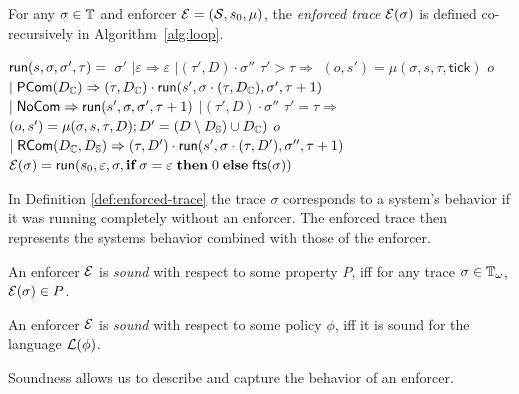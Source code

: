 \begin{definition}
    \label{def:enforced-trace}
    For any $\sigma \in \mathbb{T}$ and enforcer  $\mathcal{E}=(\mathcal{S},s_0,\mu)$, the
    \emph{enforced trace} $\mathcal{E}(\sigma)$ is defined co-recursively in
    Algorithm~\ref{alg:loop}.
    \begin{algorithm}[t]
        \begin{algorithmic}[1]
            \State $\mathsf{run}(s,\sigma,\sigma',\tau)=$~\Case\;$\sigma'$ \OOf
            \State $\mid \varepsilon \Rightarrow \varepsilon$
            \State $\mid(\tau', D) \cdot \sigma''$ \When\;$\tau' > \tau \Rightarrow$
            \Let\;$(o,s') = \mu(\sigma,s,\tau,\mathsf{tick})$ \IIn{}
            \State \quad \Case\;$o$ \OOf~$\mid\mathsf{PCom}(D_{\mathbb{C}}) \Rightarrow (\tau,D_{\mathbb{C}}) \cdot
                \mathsf{run}(s',\sigma\cdot (\tau, D_{\mathbb{C}}),\sigma',\tau+1)$
            \State \qquad\qquad\quad~$\mid\mathsf{NoCom} \Rightarrow \mathsf{run}(s',\sigma,\sigma',\tau+1)$
            \State  $\mid(\tau', D) \cdot \sigma''$ \When\;$\tau' = \tau \Rightarrow$
            \Let\;$(o,s') = \mu(\sigma,s,\tau,D); D' = (D \setminus D_{\mathbb{S}}) \cup D_{\mathbb{C}})$ \IIn
            \State \quad \Case\;$o$ \OOf ~$\mid \mathsf{RCom}(D_{\mathbb{C}},D_{\mathbb{S}})
                \Rightarrow (\tau, D') \cdot \mathsf{run}(s',\sigma \cdot (\tau, D'),\sigma'',\tau+1)$
            \State $\mathcal{E}(\sigma)=
                \mathsf{run}(s_0,\varepsilon,\sigma,\textbf{if}\;{\sigma=\varepsilon}\;\textbf{then}\;{0}\;\textbf{else}\;{\mathsf{fts}(\sigma)})$
        \end{algorithmic}
    \caption{Enforced trace\label{alg:loop} \cite[Fig. 2]{whyenf-2}}
    \vspace{-.6ex}
    \end{algorithm}
\end{definition}
In Definition \ref{def:enforced-trace} the trace $\sigma$ corresponds
to a system's behavior if it was running completely without an enforcer.
The enforced trace then represents the systems behavior combined with
those of the enforcer.
\begin{definition}
    \label{def:enf-sound-property}
    An enforcer $\mathcal{E}$ is \emph{sound} with respect to some property $P$, iff
    for any trace $\sigma \in \mathbb{T}_\omega$, $\mathcal{E}(\sigma) \in P$.
\end{definition}
\begin{definition}
    \label{def:enf-sound-policy}
    An enforcer $\mathcal{E}$ is \emph{sound} with respect to some policy $\phi$, iff
    it is sound for the language $\mathcal{L}(\phi)$.
\end{definition}
Soundness allows us to describe and capture the behavior of an enforcer.

